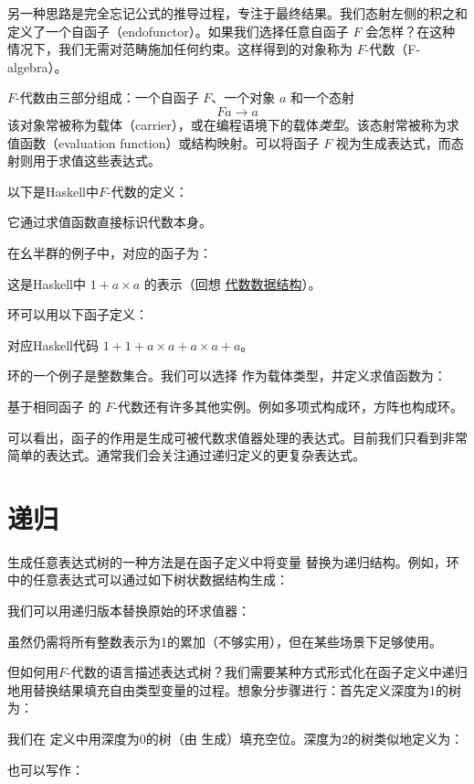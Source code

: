 另一种思路是完全忘记公式的推导过程，专注于最终结果。我们态射左侧的积之和定义了一个自函子（endofunctor）。如果我们选择任意自函子 $F$ 会怎样？在这种情况下，我们无需对范畴施加任何约束。这样得到的对象称为 $F$-代数（F-algebra）。

$F$-代数由三部分组成：一个自函子 $F$、一个对象 $a$ 和一个态射
$$F a \to a$$
该对象常被称为载体（carrier），或在编程语境下的载体\emph{类型}。该态射常被称为求值函数（evaluation function）或结构映射。可以将函子 $F$ 视为生成表达式，而态射则用于求值这些表达式。

以下是Haskell中$F$-代数的定义：

它通过求值函数直接标识代数本身。

在幺半群的例子中，对应的函子为：

这是Haskell中 $1 + a\times{}a$ 的表示（回想
\hyperref[simple-algebraic-data-types]{代数数据结构}）。

环可以用以下函子定义：

对应Haskell代码 $1 + 1 + a\times{}a + a\times{}a + a$。

环的一个例子是整数集合。我们可以选择
 作为载体类型，并定义求值函数为：

基于相同函子  的 $F$-代数还有许多其他实例。例如多项式构成环，方阵也构成环。

可以看出，函子的作用是生成可被代数求值器处理的表达式。目前我们只看到非常简单的表达式。通常我们会关注通过递归定义的更复杂表达式。

\section{递归}

生成任意表达式树的一种方法是在函子定义中将变量  替换为递归结构。例如，环中的任意表达式可以通过如下树状数据结构生成：

我们可以用递归版本替换原始的环求值器：

虽然仍需将所有整数表示为1的累加（不够实用），但在某些场景下足够使用。

但如何用$F$-代数的语言描述表达式树？我们需要某种方式形式化在函子定义中递归地用替换结果填充自由类型变量的过程。想象分步骤进行：首先定义深度为1的树为：

我们在  定义中用深度为0的树（由  生成）填充空位。深度为2的树类似地定义为：

也可以写作：


